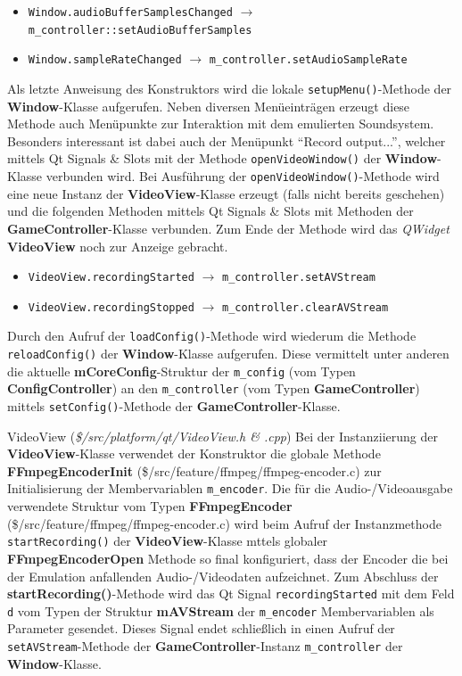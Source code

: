 \documentclass[11pt,a4paper]{scrartcl}
\begin{document}
\begin{itemize}
    \item \verb|Window.audioBufferSamplesChanged| $\rightarrow$ \verb|m_controller::setAudioBufferSamples|
    \item \verb|Window.sampleRateChanged| $\rightarrow$ \verb|m_controller.setAudioSampleRate|
\end{itemize}

Als letzte Anweisung des Konstruktors wird die lokale \verb|setupMenu()|-Methode der \textbf{Window}-Klasse aufgerufen. Neben diversen Men\"ueintr\"agen erzeugt diese Methode auch Men\"upunkte zur Interaktion mit dem emulierten Soundsystem. Besonders interessant ist dabei auch der Men\"upunkt \enquote{Record output...}, welcher mittels Qt Signals \& Slots mit der Methode \verb|openVideoWindow()| der \textbf{Window}-Klasse verbunden wird. Bei Ausf\"uhrung der \verb|openVideoWindow()|-Methode wird eine neue Instanz der \textbf{VideoView}-Klasse erzeugt (falls nicht bereits geschehen) und die folgenden Methoden mittels Qt Signals \& Slots mit Methoden der \textbf{GameController}-Klasse verbunden. Zum Ende der Methode wird das \textit{QWidget} \textbf{VideoView} noch zur Anzeige gebracht.

\begin{itemize}
    \item \verb|VideoView.recordingStarted| $\rightarrow$ \verb|m_controller.setAVStream|
    \item \verb|VideoView.recordingStopped| $\rightarrow$ \verb|m_controller.clearAVStream|
\end{itemize}


Durch den Aufruf der \verb|loadConfig()|-Methode wird wiederum die Methode \verb|reloadConfig()| der \textbf{Window}-Klasse aufgerufen. Diese vermittelt unter anderen die aktuelle \textbf{mCoreConfig}-Struktur der \verb|m_config| (vom Typen \textbf{ConfigController}) an den \verb|m_controller| (vom Typen \textbf{GameController}) mittels \verb|setConfig()|-Methode der \textbf{GameController}-Klasse.

\vspace{5mm}
\large VideoView \normalsize(\textit{\$/src/platform/qt/VideoView.h \& .cpp})
\vspace{2mm}\newline
Bei der Instanziierung der \textbf{VideoView}-Klasse verwendet der Konstruktor die globale Methode \textbf{FFmpegEncoderInit} (\$/src/feature/ffmpeg/ffmpeg-encoder.c) zur Initialisierung der Membervariablen \verb|m_encoder|. Die f\"ur die Audio-/Videoausgabe verwendete Struktur vom Typen \textbf{FFmpegEncoder} (\$/src/feature/ffmpeg/ffmpeg-encoder.c) wird beim Aufruf der Instanzmethode \verb|startRecording()| der \textbf{VideoView}-Klasse mttels globaler \textbf{FFmpegEncoderOpen} Methode so final konfiguriert, dass der Encoder die bei der Emulation anfallenden Audio-/Videodaten aufzeichnet. Zum Abschluss der \textbf{startRecording()}-Methode wird das Qt Signal \verb|recordingStarted| mit dem Feld \verb|d| vom Typen der Struktur \textbf{mAVStream} der \verb|m_encoder| Membervariablen als Parameter gesendet. Dieses Signal endet schlie{\ss}lich in einen Aufruf der \verb|setAVStream|-Methode der \textbf{GameController}-Instanz \verb|m_controller| der \textbf{Window}-Klasse.
\end{document}

